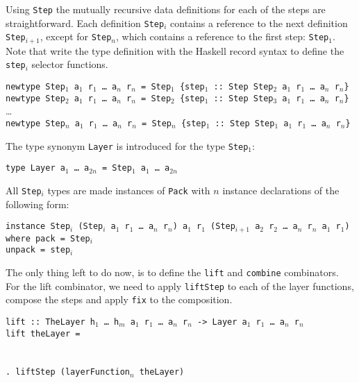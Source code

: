 Using \texttt{Step} the mutually recursive data definitions for each of the steps are straightforward. Each definition \texttt{Step$_i$} contains a reference to the next definition \texttt{Step$_{i+1}$}, except for \texttt{Step$_n$}, which contains a reference to the first step: \texttt{Step$_1$}. Note that write the type definition with the Haskell record syntax to define the \texttt{step$_i$} selector functions.

{\tt newtype Step$_1$ a$_1$ r$_1$ \dots~a$_n$ r$_n$ = Step$_1$ \{step$_1$}\verb| :: |{\tt Step Step$_2$ a$_1$ r$_1$ \dots~a$_n$ r$_n$\}}\\
{\tt newtype Step$_2$ a$_1$ r$_1$ \dots~a$_n$ r$_n$ = Step$_2$ \{step$_1$}\verb| :: |{\tt Step Step$_3$ a$_1$ r$_1$ \dots~a$_n$ r$_n$\}}\\
\dots \\
{\tt newtype Step$_n$ a$_1$ r$_1$ \dots~a$_n$ r$_n$ = Step$_n$ \{step$_1$}\verb| :: |{\tt Step Step$_1$ a$_1$ r$_1$ \dots~a$_n$ r$_n$\}}

The type synonym \texttt{Layer} is introduced for the type \texttt{Step$_1$}:

{\tt type Layer a$_1$ \dots~a$_{2n}$ = Step$_1$ a$_1$ \dots~a$_{2n}$}

All \texttt{Step$_i$} types are made instances of \texttt{Pack} with $n$ instance declarations of the following form:

\begin{tabbing}
{\tt i}\={\tt nstance Step$_i$ (Step$_i$ a$_1$ r$_1$ \dots~a$_n$  r$_n$) a$_1$ r$_1$ (Step$_{i+1}$ a$_2$ r$_2$ \dots~a$_n$ r$_n$ a$_1$ r$_1$)}\\
\> {\tt where }\={\tt pack = Step$_i$}\\
\>\> {\tt unpack = step$_i$}
\end{tabbing}

The only thing left to do now, is to define the \texttt{lift} and \texttt{combine} combinators. For the lift combinator, we need to apply \texttt{liftStep} to each of the layer functions, compose the steps and apply \texttt{fix} to the composition. 

\begin{tabbing}
{\tt lift}\verb| :: |{\tt TheLayer h$_1$ \dots ~h$_m$ a$_1$ r$_1$ \dots ~a$_n$ r$_n$ -> Layer a$_1$ r$_1$ \dots ~a$_n$ r$_n$}\\
{\tt li}\={\tt ft t}\={\tt heLayer = }\\
\\
\>\>{\tt \dots}\\ 
\>\>\verb|. lift|{\tt Step (layerFunction$_n$ theLayer)}
\end{tabbing}

